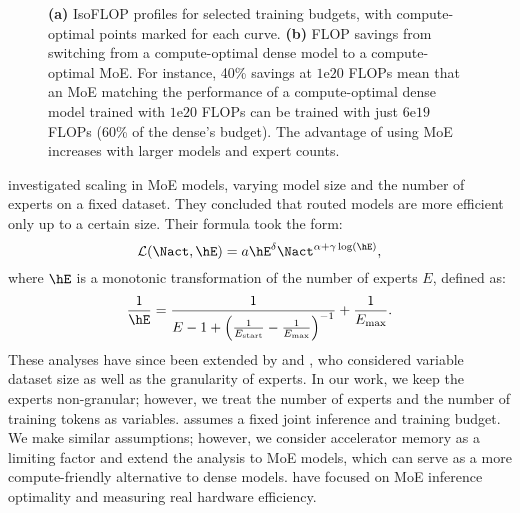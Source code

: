 \begin{figure*}
    \centering
\caption{\textbf{(a)} IsoFLOP profiles for selected training budgets, with compute-optimal points marked for each curve. \textbf{(b)} FLOP savings from switching from a compute-optimal dense model to a compute-optimal MoE. For instance, 40\% savings at $1$e$20$ FLOPs mean that an MoE matching the performance of a compute-optimal dense model trained with $1$e$20$ FLOPs can be trained with just $6$e$19$ FLOPs (60\% of the dense's budget). The advantage of using MoE increases with larger models and expert counts.}
    
  \label{fig:isoflops}
\end{figure*}

\citet{clark2022unified} investigated scaling in MoE models, varying model size and the number of experts on a fixed dataset. They concluded that routed models are more efficient only up to a certain size. Their formula took the form:
\begin{equation} \label{eq:scaling_law_clark}
  \mathcal{L}(\Nact, \hE) = a\hE^{\delta}\Nact^{\alpha + \gamma \log(\hE)},
\end{equation}
where $\hE$ is a monotonic transformation of the number of experts $E$, defined as:
\begin{equation} \label{eq:e_transformation}
    \frac{1}{\hE} = \frac{1}{E - 1 + \left(\frac{1}{E_{\text{start}}} - \frac{1}{E_{\text{max}}}\right)^{-1}} + \frac{1}{E_{\text{max}}}.
\end{equation}
These analyses have since been extended by \citet{ludziejewskiscaling} and \citet{dai2024deepseekmoe}, who considered variable dataset size as well as the granularity of experts. In our work, we keep the experts non-granular; however, we treat the number of experts and the number of training tokens as variables. \citet{sardana2024chinchillaoptimalaccountinginferencelanguage} assumes a fixed joint inference and training budget. We make similar assumptions; however, we consider accelerator memory as a limiting factor and extend the analysis to MoE models, which can serve as a more compute-friendly alternative to dense models. \citet{yun2024inferenceoptimalmixtureofexpertlargelanguage} have focused on MoE inference optimality and measuring real hardware efficiency.

